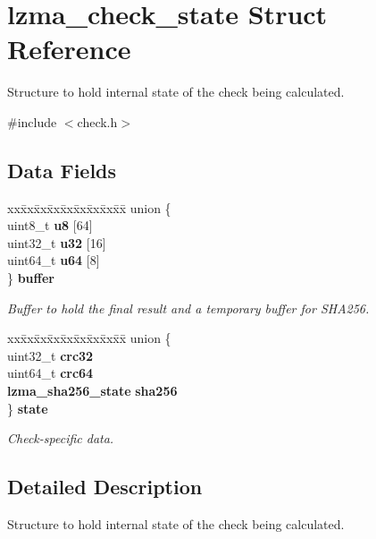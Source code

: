 \section{lzma\+\_\+check\+\_\+state Struct Reference}
\label{structlzma__check__state}


Structure to hold internal state of the check being calculated.  




{\ttfamily \#include $<$check.\+h$>$}

\subsection*{Data Fields}
\begin{DoxyCompactItemize}
\item 
\begin{tabbing}
xx\=xx\=xx\=xx\=xx\=xx\=xx\=xx\=xx\=\kill
union \{\\
\>uint8\_t {\bfseries u8} [64]\\
\>uint32\_t {\bfseries u32} [16]\\
\>uint64\_t {\bfseries u64} [8]\\
\} \textbf{ buffer}\\

\end{tabbing}\begin{DoxyCompactList}\small\item\em Buffer to hold the final result and a temporary buffer for S\+H\+A256. \end{DoxyCompactList}\item 
\begin{tabbing}
xx\=xx\=xx\=xx\=xx\=xx\=xx\=xx\=xx\=\kill
union \{\\
\>uint32\_t {\bfseries crc32}\\
\>uint64\_t {\bfseries crc64}\\
\>\textbf{ lzma\_sha256\_state} {\bfseries sha256}\\
\} \textbf{ state}\\

\end{tabbing}\begin{DoxyCompactList}\small\item\em Check-\/specific data. \end{DoxyCompactList}\end{DoxyCompactItemize}


\subsection{Detailed Description}
Structure to hold internal state of the check being calculated. 


